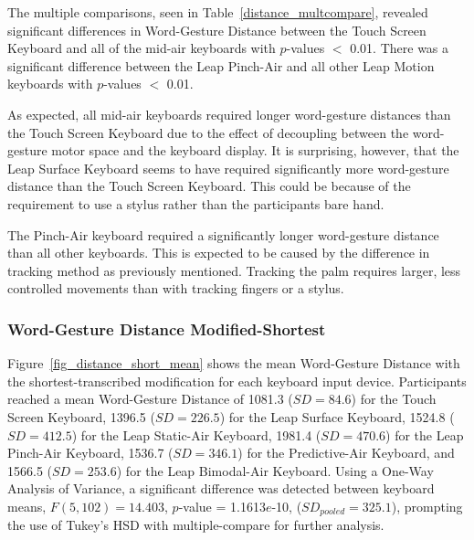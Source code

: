 The multiple comparisons, seen in Table~\ref{distance_multcompare}, revealed significant differences in Word-Gesture Distance between the Touch Screen Keyboard and all of the mid-air keyboards with $p$-values $<$ 0.01. There was a significant difference between the Leap Pinch-Air and all other Leap Motion keyboards with $p$-values $<$ 0.01.

As expected, all mid-air keyboards required longer word-gesture distances than the Touch Screen Keyboard due to the effect of decoupling between the word-gesture motor space and the keyboard display. It is surprising, however, that the Leap Surface Keyboard seems to have required significantly more word-gesture distance than the Touch Screen Keyboard. This could be because of the requirement to use a stylus rather than the participants bare hand.

The Pinch-Air keyboard required a significantly longer word-gesture distance than all other keyboards. This is expected to be caused by the difference in tracking method as previously mentioned. Tracking the palm requires larger, less controlled movements than with tracking fingers or a stylus.

\subsubsection{Word-Gesture Distance Modified-Shortest}
Figure~\ref{fig_distance_short_mean} shows the mean Word-Gesture Distance with the shortest-transcribed modification for each keyboard input device. Participants reached a mean Word-Gesture Distance of 1081.3 ($SD = 84.6$) for the Touch Screen Keyboard, 1396.5 ($SD = 226.5$) for the Leap Surface Keyboard, 1524.8 ($SD = 412.5$) for the Leap Static-Air Keyboard, 1981.4 ($SD = 470.6$) for the Leap Pinch-Air Keyboard, 1536.7 ($SD = 346.1$) for the Predictive-Air Keyboard, and 1566.5 ($SD = 253.6$) for the Leap Bimodal-Air Keyboard. Using a One-Way Analysis of Variance, a significant difference was detected between keyboard means, $F(5, 102) = 14.403$, $p$-value = 1.1613$e$-10, ($SD_{pooled} = 325.1$), prompting the use of Tukey's HSD with multiple-compare for further analysis.

